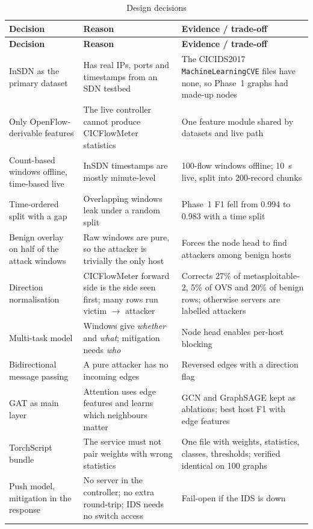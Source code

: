 \begin{longtable}{|p{3.6cm}|p{5.0cm}|p{5.4cm}|}
\caption{Design decisions}\label{tab:decisions}\\
\hline
\textbf{Decision} & \textbf{Reason} & \textbf{Evidence / trade-off} \\ \hline
\endfirsthead
\hline \textbf{Decision} & \textbf{Reason} & \textbf{Evidence / trade-off} \\ \hline
\endhead
InSDN as the primary dataset & Has real IPs, ports and timestamps from an SDN testbed & The CICIDS2017 \texttt{MachineLearningCVE} files have none, so Phase~1 graphs had made-up nodes \\ \hline
Only OpenFlow-derivable features & The live controller cannot produce CICFlowMeter statistics & One feature module shared by datasets and live path \\ \hline
Count-based windows offline, time-based live & InSDN timestamps are mostly minute-level & 100-flow windows offline; 10~s live, split into 200-record chunks \\ \hline
Time-ordered split with a gap & Overlapping windows leak under a random split & Phase~1 F1 fell from 0.994 to 0.983 with a time split \\ \hline
Benign overlay on half of the attack windows & Raw windows are pure, so the attacker is trivially the only host & Forces the node head to find attackers among benign hosts \\ \hline
Direction normalisation & CICFlowMeter forward side is the side seen first; many rows run victim $\to$ attacker & Corrects 27\% of metasploitable-2, 5\% of OVS and 20\% of benign rows; otherwise servers are labelled attackers \\ \hline
Multi-task model & Windows give \emph{whether} and \emph{what}; mitigation needs \emph{who} & Node head enables per-host blocking \\ \hline
Bidirectional message passing & A pure attacker has no incoming edges & Reversed edges with a direction flag \\ \hline
GAT as main layer & Attention uses edge features and learns which neighbours matter & GCN and GraphSAGE kept as ablations; best host F1 with edge features \\ \hline
TorchScript bundle & The service must not pair weights with wrong statistics & One file with weights, statistics, classes, thresholds; verified identical on 100 graphs \\ \hline
Push model, mitigation in the response & No server in the controller; no extra round-trip; IDS needs no switch access & Fail-open if the IDS is down \\ \hline

\end{longtable}
